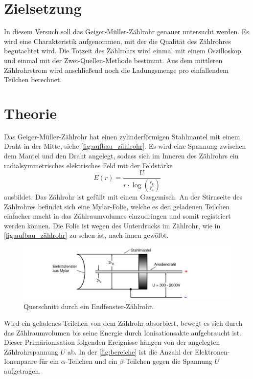 \section{Zielsetzung}
\label{sec:Zielsetzung}
In diesem Versuch soll das Geiger-Müller-Zählrohr genauer untersucht werden. Es wird eine Charakteristik aufgenommen, mit der die Qualität des Zählrohres begutachtet wird.
Die Totzeit des Zählrohrs wird einmal mit einem Oszilloskop und einmal mit der Zwei-Quellen-Methode bestimmt. 
Aus dem mittleren Zählrohrstrom wird anschließend noch die Ladungsmenge pro einfallendem Teilchen berechnet.
\section{Theorie}
\label{sec:Theorie}
Das Geiger-Müller-Zählrohr hat einen zylinderförmigen Stahlmantel mit einem Draht in der Mitte, siehe \autoref{fig:aufbau_zählrohr}.
Es wird eine Spannung zwischen dem Mantel und den Draht angelegt, sodass sich im Inneren des Zählrohrs ein radialsymmetrisches elektrisches Feld mit der Feldstärke
\begin{equation*}
    E(r) = \frac{U}{r \cdot \log(\frac{r_{\text{k}}}{r_{\text{a}}})}
\end{equation*}
ausbildet.
Das Zählrohr ist gefüllt mit einem Gasgemisch.
An der Stirnseite des Zählrohres befindet sich eine Mylar-Folie, welche es den geladenen Teilchen einfacher macht in das Zählraumvolumes einzudringen und somit registriert werden können.
Die Folie ist wegen des Unterdrucks im Zählrohr, wie in \autoref{fig:aufbau_zählrohr} zu sehen ist, nach innen gewölbt.
\begin{figure}
    \centering
    \includegraphics[width=\textwidth]{content/aufbau_zahlrohr.pdf}
    \caption{Querschnitt durch ein Endfenster-Zählrohr.\cite{anleitung}}
    \label{fig:aufbau_zählrohr}
\end{figure}
Wird ein geladenes Teilchen von dem Zählrohr absorbiert, bewegt es sich durch das Zählraumvolumen bis seine Energie durch Ionisationsakte aufgebraucht ist.
Dieser Primärionisation folgenden Ereignisse hängen von der angelegten Zählrohrspannung $U$ ab.
In der \autoref{fig:bereiche} ist die Anzahl der Elektronen-Ionenpaare für ein $\alpha$-Teilchen und ein $\beta$-Teilchen gegen die Spannung $U$ aufgetragen.
